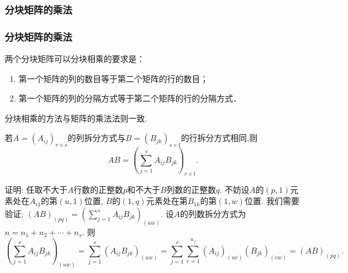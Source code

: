 \subsubsection{分块矩阵的乘法}
\begin{frame}\frametitle{分块矩阵的乘法}
两个分块矩阵可以分块相乘的要求是：
\begin{enumerate}
\item 第一个矩阵的列的数目等于第二个矩阵的行的数目；
\item 第一个矩阵的列的分隔方式等于第二个矩阵的行的分隔方式．
\end{enumerate}
\pp
分块相乘的方法与矩阵的乘法法则一致.
\begin{theorem}若$A = (A_{ij})_{r\times s}$的列拆分方式与$B = (B_{jk})_{s\times t}$的行拆分方式相同,则
\[AB = \left(\sum\limits_{j=1}^s A_{ij}B_{jk}\right)_{r\times t}.\]
\end{theorem}
\pp
{\tiny
证明: 任取不大于$A$行数的正整数$p$和不大于$B$列数的正整数$q$. 不妨设$A$的$(p,1)$元素处在$A_{i1}$的第$(u,1)$位置, $B$的$(1,q)$元素处在第$B_{1k}$的第$(1,w)$位置. 我们需要验证: $(AB)_{(pq)}=\left(\sum\limits_{j=1}^s A_{ij}B_{jk}\right)_{(uw)}$.
设$A$的列数拆分方式为 $n=n_1+n_2+\cdots+n_s$. 则
\[\left(\sum_{j=1}^s A_{ij}B_{jk}\right)_{(uw)}=\sum_{j=1}^s \left(A_{ij}B_{jk}\right)_{(uw)}=\sum_{j=1}^s\sum_{v=1}^{n_j}\left(A_{ij}\right)_{(uv)}\left(B_{jk}\right)_{(vw)}=(AB)_{(pq)}.\]
}
\end{frame}






